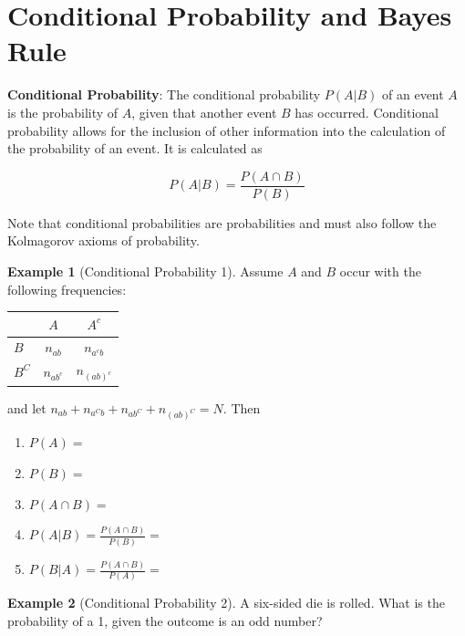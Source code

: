 \documentclass[
]{book}
\providecommand{\tightlist}{%
  \setlength{\itemsep}{0pt}\setlength{\parskip}{0pt}}
\theoremstyle{definition}
\theoremstyle{definition}
\newtheorem{example}{Example}[chapter]
\theoremstyle{definition}
\theoremstyle{definition}
\theoremstyle{remark}
\begin{document}
\hypertarget{conditional-probability-and-bayes-rule}{%
\section{Conditional Probability and Bayes Rule}\label{conditional-probability-and-bayes-rule}}

\textbf{Conditional Probability}: The conditional probability \(P(A|B)\) of an event \(A\) is the probability of \(A\), given that another event \(B\) has occurred. Conditional probability allows for the inclusion of other information into the calculation of the probability of an event. It is calculated as

\[P(A|B)=\frac{P(A\cap B)}{P(B)}\]

Note that conditional probabilities are probabilities and must also follow the Kolmagorov axioms of probability.

\begin{example}[Conditional Probability 1]
\protect\hypertarget{exm:condprobexm1}{}{\label{exm:condprobexm1} {} }
Assume \(A\) and \(B\) occur with the following frequencies: \(\quad\)

\begin{longtable}[]{@{}lcc@{}}
\toprule
& \(A\) & \(A^c\)\tabularnewline
\midrule
\endhead
\(B\) & \(n_{ab}\) & \(n_{a^cb}\)\tabularnewline
\(B^C\) & \(n_{ab^c}\) & \(n_{(ab)^c}\)\tabularnewline
\bottomrule
\end{longtable}

and let \(n_{ab}+n_{a^Cb}+n_{ab^C}+n_{(ab)^C}=N\). Then

\begin{enumerate}
\def\labelenumi{\arabic{enumi}.}
\tightlist
\item
  \(P(A)=\)
\item
  \(P(B)=\)
\item
  \(P(A\cap B)=\)
\item
  \(P(A|B)= \frac{P(A\cap B)}{P(B)}=\)
\item
  \(P(B|A)= \frac{P(A\cap B)}{P(A)}=\)
\end{enumerate}
\end{example}

\begin{example}[Conditional Probability 2]
\protect\hypertarget{exm:condprobexm2}{}{\label{exm:condprobexm2} {} }
A six-sided die is rolled. What is the probability of a 1, given the outcome is an odd number?
\end{example}
\end{document}
